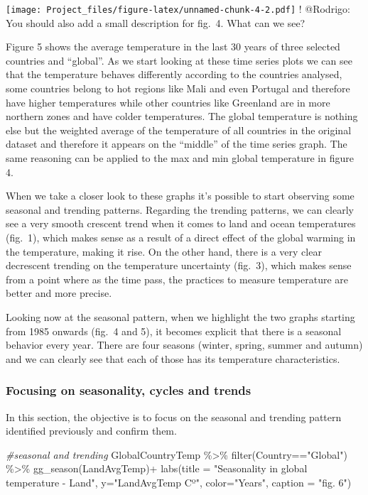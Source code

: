 \documentclass[
]{article}
\newenvironment{Shaded}{\begin{snugshade}}{\end{snugshade}}
\newcommand{\AttributeTok}[1]{\textcolor[rgb]{0.77,0.63,0.00}{#1}}
\newcommand{\CommentTok}[1]{\textcolor[rgb]{0.56,0.35,0.01}{\textit{#1}}}
\newcommand{\FunctionTok}[1]{\textcolor[rgb]{0.00,0.00,0.00}{#1}}
\newcommand{\NormalTok}[1]{#1}
\newcommand{\SpecialCharTok}[1]{\textcolor[rgb]{0.00,0.00,0.00}{#1}}
\newcommand{\StringTok}[1]{\textcolor[rgb]{0.31,0.60,0.02}{#1}}
\begin{document}
\texttt{[image: Project\_files/figure-latex/unnamed-chunk-4-2.pdf]} !
@Rodrigo: You should also add a small description for fig.~4. What can
we see?

Figure 5 shows the average temperature in the last 30 years of three
selected countries and ``global''. As we start looking at these time
series plots we can see that the temperature behaves differently
according to the countries analysed, some countries belong to hot
regions like Mali and even Portugal and therefore have higher
temperatures while other countries like Greenland are in more northern
zones and have colder temperatures. The global temperature is nothing
else but the weighted average of the temperature of all countries in the
original dataset and therefore it appears on the ``middle'' of the time
series graph. The same reasoning can be applied to the max and min
global temperature in figure 4.

When we take a closer look to these graphs it's possible to start
observing some seasonal and trending patterns. Regarding the trending
patterns, we can clearly see a very smooth crescent trend when it comes
to land and ocean temperatures (fig.~1), which makes sense as a result
of a direct effect of the global warming in the temperature, making it
rise. On the other hand, there is a very clear decrescent trending on
the temperature uncertainty (fig.~3), which makes sense from a point
where as the time pass, the practices to measure temperature are better
and more precise.

Looking now at the seasonal pattern, when we highlight the two graphs
starting from 1985 onwards (fig.~4 and 5), it becomes explicit that
there is a seasonal behavior every year. There are four seasons (winter,
spring, summer and autumn) and we can clearly see that each of those has
its temperature characteristics.

\hypertarget{focusing-on-seasonality-cycles-and-trends}{%
\subsubsection{Focusing on seasonality, cycles and
trends}\label{focusing-on-seasonality-cycles-and-trends}}

In this section, the objective is to focus on the seasonal and trending
pattern identified previously and confirm them.

\begin{Shaded}
\begin{Highlighting}[]
\CommentTok{\#seasonal and trending}
\NormalTok{GlobalCountryTemp }\SpecialCharTok{\%\textgreater{}\%} 
  \FunctionTok{filter}\NormalTok{(Country}\SpecialCharTok{==}\StringTok{"Global"}\NormalTok{) }\SpecialCharTok{\%\textgreater{}\%} 
  \FunctionTok{gg\_season}\NormalTok{(LandAvgTemp)}\SpecialCharTok{+}
  \FunctionTok{labs}\NormalTok{(}\AttributeTok{title =} \StringTok{"Seasonality in global temperature {-} Land"}\NormalTok{,}
       \AttributeTok{y=}\StringTok{"LandAvgTemp Cº"}\NormalTok{,}
       \AttributeTok{color=}\StringTok{"Years"}\NormalTok{,}
       \AttributeTok{caption =} \StringTok{"fig. 6"}\NormalTok{)}
\end{Highlighting}
\end{Shaded}
\end{document}
